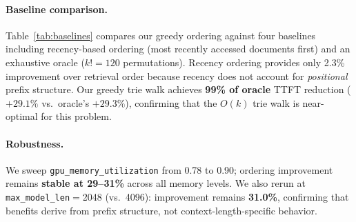 \documentclass{article}
\begin{document}
\paragraph{Baseline comparison.}
Table~\ref{tab:baselines} compares our greedy ordering against four baselines including recency-based ordering (most recently accessed documents first) and an exhaustive oracle ($k!{=}120$ permutations). Recency ordering provides only 2.3\% improvement over retrieval order because recency does not account for \emph{positional} prefix structure. Our greedy trie walk achieves \textbf{99\% of oracle} TTFT reduction ($+29.1\%$ vs.\ oracle's $+29.3\%$), confirming that the $O(k)$ trie walk is near-optimal for this problem.

\begin{table}[t]
\caption{Ordering baselines (RTX 4090, 195 queries). Greedy trie achieves 99\% of oracle's TTFT reduction. Recency and Oracle come from a separate run that included those ordering modes; the percentages in the last column are all recomputed against the displayed Retrieval p50=56.6\,ms so rows are internally consistent.}
\label{tab:baselines}
\centering
\small
{}
\vspace{-0.5em}
\end{table}

\paragraph{Robustness.}
We sweep \texttt{gpu\_memory\_utilization} from 0.78 to 0.90; ordering improvement remains \textbf{stable at 29--31\%} across all memory levels. We also rerun at \texttt{max\_model\_len}$=$2048 (vs.\ 4096): improvement remains \textbf{31.0\%}, confirming that benefits derive from prefix structure, not context-length-specific behavior.
\end{document}
